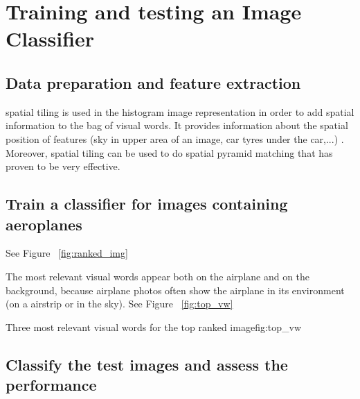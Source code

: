 \documentclass{article}
\begin{document}
\maketitle

\section{Training and testing an Image Classifier}
\subsection{Data preparation and feature extraction}

spatial tiling is used in the histogram image representation in order to add spatial information to the bag of visual words. It provides information about the spatial position of features (sky in upper area of an image, car tyres under the car,...) . Moreover, spatial tiling can be used to do spatial pyramid matching that has proven to be very effective.

\subsection{Train a classifier for images containing aeroplanes}

See Figure ~\ref{fig:ranked_img}



The most relevant visual words appear both on the airplane and on the background, because airplane photos often show the airplane in its environment (on a airstrip or in the sky). See Figure ~\ref{fig:top_vw}

          {}
          {}
          {Three most relevant visual words for the top ranked image}{fig:top_vw}


\subsection{Classify the test images and assess the performance}
\end{document}
